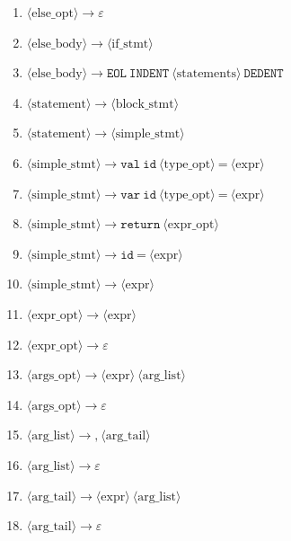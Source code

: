 \begin{enumerate}
    \item $\langle\text{else\_opt}\rangle \to \varepsilon$
    \item $\langle\text{else\_body}\rangle \to \langle\text{if\_stmt}\rangle$
    \item $\langle\text{else\_body}\rangle \to \texttt{EOL}\ \texttt{INDENT}\ \langle\text{statements}\rangle\ \texttt{DEDENT}$
    \item $\langle\text{statement}\rangle \to \langle\text{block\_stmt}\rangle$
    \item $\langle\text{statement}\rangle \to \langle\text{simple\_stmt}\rangle$
    \item $\langle\text{simple\_stmt}\rangle \to \texttt{val}\ \texttt{id}\ \langle\text{type\_opt}\rangle\ \texttt{=}\ \langle\text{expr}\rangle$
    \item $\langle\text{simple\_stmt}\rangle \to \texttt{var}\ \texttt{id}\ \langle\text{type\_opt}\rangle\ \texttt{=}\ \langle\text{expr}\rangle$
    \item $\langle\text{simple\_stmt}\rangle \to \texttt{return}\ \langle\text{expr\_opt}\rangle$
    \item $\langle\text{simple\_stmt}\rangle \to \texttt{id}\ \texttt{=}\ \langle\text{expr}\rangle$
    \item $\langle\text{simple\_stmt}\rangle \to \langle\text{expr}\rangle$
    \item $\langle\text{expr\_opt}\rangle \to \langle\text{expr}\rangle$
    \item $\langle\text{expr\_opt}\rangle \to \varepsilon$
    \item $\langle\text{args\_opt}\rangle \to \langle\text{expr}\rangle\ \langle\text{arg\_list}\rangle$
    \item $\langle\text{args\_opt}\rangle \to \varepsilon$
    \item $\langle\text{arg\_list}\rangle \to \texttt{,}\ \langle\text{arg\_tail}\rangle$
    \item $\langle\text{arg\_list}\rangle \to \varepsilon$
    \item $\langle\text{arg\_tail}\rangle \to \langle\text{expr}\rangle\ \langle\text{arg\_list}\rangle$
    \item $\langle\text{arg\_tail}\rangle \to \varepsilon$
\end{enumerate}

